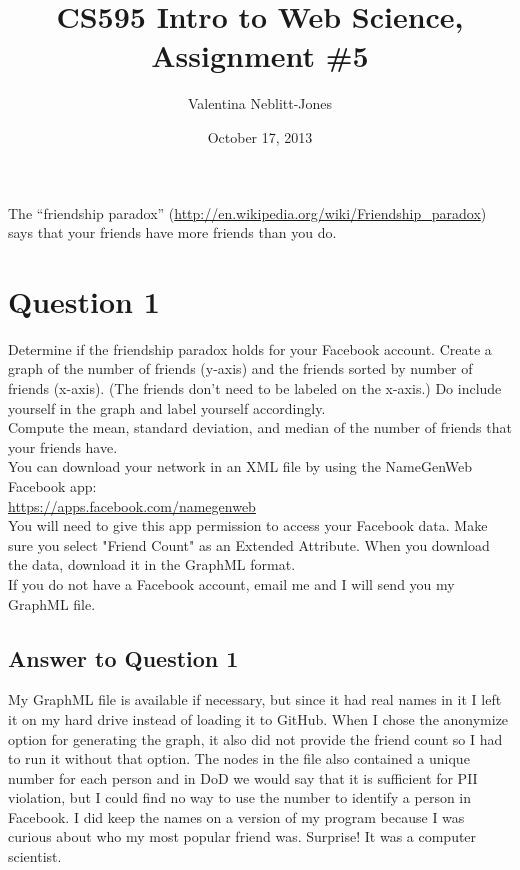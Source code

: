 \documentclass{article}
\begin{document}
\title{CS595 Intro to Web Science, Assignment \#5}
\author{Valentina Neblitt-Jones}
\date{October 17, 2013}
\maketitle

The ``friendship paradox'' (\url{http://en.wikipedia.org/wiki/Friendship_paradox})  says that your friends have more friends than you do. \\

\section*{Question 1}

Determine if the friendship paradox holds for your Facebook account. Create a graph of the number of friends (y-axis) and the friends sorted by number of friends (x-axis). (The friends don't need to be labeled on the x-axis.) Do include yourself in the graph and label yourself accordingly. \\

Compute the mean, standard deviation, and median of the number of friends that your friends have. \\

You can download your network in an XML file by using the NameGenWeb Facebook app:  \\

\url{https://apps.facebook.com/namegenweb} \\

You will need to give this app permission to access your Facebook data. Make sure you select "Friend Count" as an Extended Attribute. When you download the data, download it in the GraphML format. \\

If you do not have a Facebook account, email me and I will send you my GraphML file.

\subsection*{Answer to Question 1}

My GraphML file is available if necessary, but since it had real names in it I left it on my hard drive instead of loading it to GitHub. When I chose the anonymize option for generating the graph, it also did not provide the friend count so I had to run it without that option. The nodes in the file also contained a unique number for each person and in DoD we would say that it is sufficient for PII violation, but I could find no way to use the number to identify a person in Facebook. I did keep the names on a version of my program because I was curious about who my most popular friend was. Surprise! It was a computer scientist.
\end{document}
